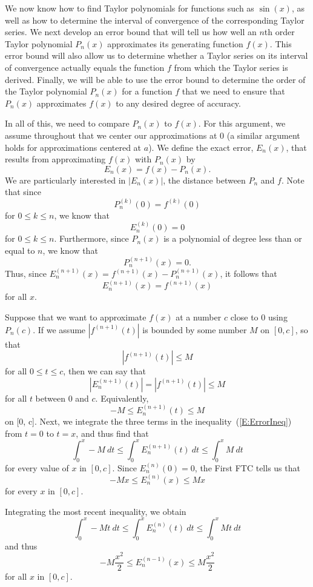 We now know how to find Taylor polynomials for functions such as $\sin(x)$, as well as how to determine the interval of convergence of the corresponding Taylor series.  We next develop an error bound that will tell us how well an $n$th order Taylor polynomial $P_n(x)$ approximates its generating function $f(x)$. This error bound will also allow us to determine whether a Taylor series on its interval of convergence actually equals the function $f$ from which the Taylor series is derived. Finally, we will be able to use the error bound to determine the order of the Taylor polynomial $P_n(x)$ for a function $f$ that we need to ensure that $P_n(x)$ approximates $f(x)$ to any desired degree of accuracy.

In all of this, we need to compare $P_n(x)$ to $f(x)$. For this argument, we assume throughout that we center our approximations at 0 (a similar argument holds for approximations centered at $a$). We define the exact error, $E_n(x)$, that results from approximating $f(x)$ with $P_n(x)$ by
\[E_n(x) = f(x) - P_n(x).\]
We are particularly interested in $|E_n(x)|$, the distance between $P_n$ and $f$. Note that since
\[P^{(k)}_n(0) = f^{(k)}(0)\]
for $0 \leq k \leq n$, we know that
\[E^{(k)}_n(0) = 0\]
for $0 \leq k \leq n$. Furthermore, since $P_n(x)$ is a polynomial of degree less than or equal to $n$, we know that
\[P_n^{(n+1)}(x) = 0.\]
Thus, since $E^{(n+1)}_n(x) = f^{(n+1)}(x) - P_n^{(n+1)}(x)$, it follows that
\[E^{(n+1)}_n(x) = f^{(n+1)}(x)\]
for all $x$.

Suppose that we want to approximate $f(x)$ at a number $c$ close to 0 using $P_n(c)$.  If we assume $|f^{(n+1)}(t)|$ is bounded by some number $M$ on $[0, c]$, so that
\[\left|f^{(n+1)}(t)\right| \leq M\]
for all $0 \leq t \leq c$, then we can say that
\[\left|E^{(n+1)}_n(t)\right| = \left|f^{(n+1)}(t)\right| \leq M\]
for all $t$ between 0 and $c$.  Equivalently, 
\begin{equation} \label{E:ErrorIneq}
-M \leq E^{(n+1)}_n(t) \leq M
\end{equation}
on [0, c]. Next, we integrate the three terms in the inequality~(\ref{E:ErrorIneq}) from $t = 0$ to $t = x$, and thus find that
\[\int_0^x -M \ dt \leq \int_0^x E^{(n+1)}_n(t) \ dt \leq \int_0^x M \ dt\]
for every value of $x$ in $[0, c]$. Since $E^{(n)}_n(0) = 0$, the First FTC tells us that
\[-Mx \leq E^{(n)}_n(x) \leq Mx\]
for every $x$ in $[0, c]$.

Integrating the most recent inequality, we obtain
\[\int_0^x -Mt \ dt \leq \int_0^x E^{(n)}_n(t) \ dt \leq \int_0^x Mt \ dt\]
and thus
\[-M\frac{x^2}{2} \leq E^{(n-1)}_n(x) \leq M\frac{x^2}{2}\]
for all $x$ in $[0, c]$.

